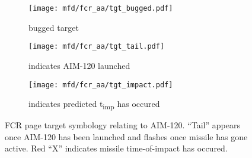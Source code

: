 \begin{figure}[htbp]
    \centering
    \begin{subfigure}[t]{0.3\linewidth}
        \centering
        \texttt{[image: mfd/fcr\_aa/tgt\_bugged.pdf]}
        \caption{bugged target}
    \end{subfigure}
    \begin{subfigure}[t]{0.3\linewidth}
        \centering
        \texttt{[image: mfd/fcr\_aa/tgt\_tail.pdf]}
        \caption{indicates AIM-120 launched}
    \end{subfigure}
    \begin{subfigure}[t]{0.3\linewidth}
        \centering
        \texttt{[image: mfd/fcr\_aa/tgt\_impact.pdf]}
        \caption{indicates predicted t\textsubscript{imp} has occured}
    \end{subfigure}
    \caption{
        FCR page target symbology relating to AIM-120. 
        ``Tail'' appears once AIM-120 has been launched and flashes once missile has gone active. 
        Red ``X'' indicates missile time-of-impact has occured.
    }
\end{figure}

\marginfigeometry


